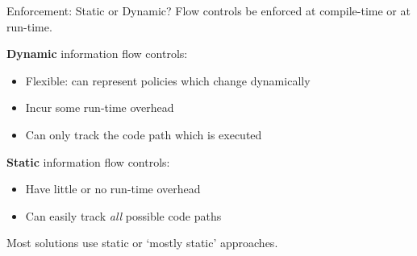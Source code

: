 %	

\begin{frame}{Enforcement: Static or Dynamic?}
	Flow controls be enforced at compile-time or at run-time.
	
	\textbf{Dynamic} information flow controls:
	\begin{itemize}
		\item Flexible: can represent policies which change dynamically
		\item Incur some run-time overhead
		\item Can only track the code path which is executed
	\end{itemize}
	
	\textbf{Static} information flow controls:
	\begin{itemize}
		\item Have little or no run-time overhead
		\item Can easily track \textit{all} possible code paths
	\end{itemize}
	
	Most solutions use static or `mostly static' approaches.
\end{frame}

